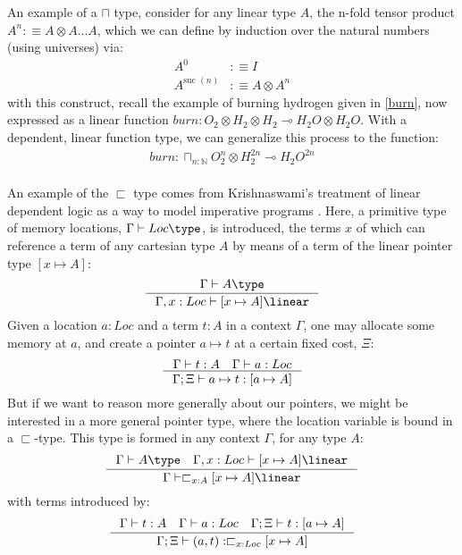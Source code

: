 An example of a $\sqcap$ type, consider for any linear type $A$, the n-fold tensor product $A^n :\equiv A \otimes A \dots A$, which we can define by induction over the natural numbers (using universes) via:
\[
  \begin{split}
  A^0 &:\equiv I\\
  A^{\text{suc }(n)} &:\equiv A \otimes A^n
  \end{split}
\]
with this construct, recall the example of burning hydrogen given in \ref{burn}, now expressed as a linear function $burn : O_2 \otimes H_2 \otimes H_2 \multimap H_2O \otimes H_2O$. With a dependent, linear function type, we can generalize this process to the function:
\[
  \begin{split}
  burn : \sqcap_{n : \mathbb{N}}O_2^n \otimes H_2^{2n} \multimap H_2O^{2n}
  \end{split}
\]
\\
An example of the $\sqsubset$ type comes from Krishnaswami's treatment of linear dependent logic as a way to model imperative programs \cite{krishnaswami}. Here, a primitive type of memory locations, $\Gamma \vdash Loc \type$, is introduced, the terms $x$ of which can reference a term of any cartesian type $A$ by means of a term of the linear pointer type $[x \mapsto A]$:
\[ 
  \inference{\Gamma \vdash A \type}
  {\Gamma, x : Loc \vdash [x \mapsto A] \linear}
\]
Given a location $a : Loc$ and a term $t : A$ in a context $\Gamma$, one may allocate some memory at $a$, and create a pointer $a \mapsto t$ at a certain fixed cost, $\Xi$:
\[
  \inference{\Gamma \vdash t : A \quad \Gamma \vdash a : Loc}
  {\Gamma; \Xi \vdash a \mapsto t : [a \mapsto A]}
\]
But if we want to reason more generally about our pointers, we might be interested in a more general pointer type, where the location variable is bound in a $\sqsubset$-type. This type is formed in any context $\Gamma$, for any type $A$:
\[
  \inference{\Gamma \vdash A \type \quad \Gamma, x : Loc \vdash [x \mapsto A] \linear} 
  {\Gamma \vdash \sqsubset_{x : A}[x \mapsto A] \linear}
\]
with terms introduced by:
\[
  \inference{\Gamma \vdash t : A \quad \Gamma \vdash a : Loc \quad \Gamma; \Xi \vdash t : [a \mapsto A]}
  {\Gamma; \Xi \vdash (a, t) : \sqsubset_{x : Loc} [x \mapsto A]}
\]


